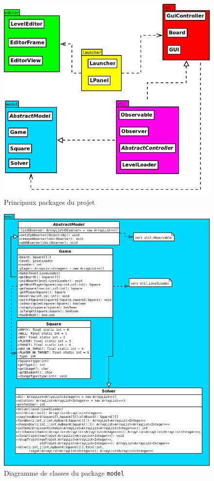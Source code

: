 \documentclass[a4paper, 11pt]{report}
\begin{document}
\begin{figure}[h!]
\centering
\includegraphics[width=.8\textwidth]{uml/general_uml.png}%
\caption{Principaux packages du projet}
\label{uml:packages}
\end{figure}

\begin{figure}[h!]
\centering
\includegraphics[width=.8\textwidth]{uml/model_uml.png}%
\caption{Diagramme de classes du package \texttt{model}}
\label{uml:model}
\end{figure}
\end{document}
